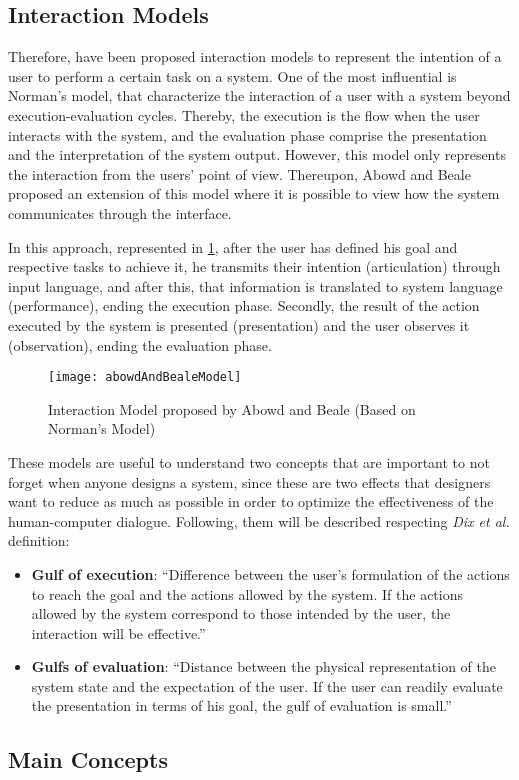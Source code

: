 \subsection{Interaction Models}
\label{subsec:interaction_models}

Therefore, have been proposed interaction models to represent the intention of a user to perform a certain task on a system. One of the most influential is Norman’s model, that characterize the interaction of a user with a system beyond execution-evaluation cycles. \cite{humanComputerInteraction} Thereby, the execution is the flow when the user interacts with the system, and the evaluation phase comprise the presentation and the interpretation of the system output. However, this model only represents the interaction from the users’ point of view. Thereupon, Abowd and Beale \cite{userSystemsAndInterfaces_aUnifyingFrameworkForInteraction} proposed an extension of this model where it is possible to view how the system communicates through the interface.

In this approach, represented in \ref{fig:abowdAndBealeModel}, after the user has defined his goal and respective tasks to achieve it, he transmits their intention (articulation) through input language, and after this, that information is translated to system language (performance), ending the execution phase. Secondly, the result of the action executed by the system is presented (presentation) and the user observes it (observation), ending the evaluation phase.

\begin{figure}[htbp]
	\centering
	\texttt{[image: abowdAndBealeModel]}
	\caption{Interaction Model proposed by Abowd and Beale \cite{userInterfacesForAll_newPerspectivesIntoHumanComputerInteraction} (Based on Norman’s Model)}
	\label{fig:abowdAndBealeModel}
\end{figure}

These models are useful to understand two concepts that are important to not forget when anyone designs a system, since these are two effects that designers want to reduce as much as possible in order to optimize the effectiveness of the human-computer dialogue. Following, them will be described respecting \textit{Dix et al.} \cite{humanComputerInteraction} definition:

\begin{itemize}
    \item \textbf{Gulf of execution}: “Difference between the user’s formulation of the actions to reach the goal and the actions allowed by the system. If the actions allowed by the system correspond to those intended by the user, the interaction will be effective.”
    \item \textbf{Gulfs of evaluation}: “Distance between the physical representation of the system state and the expectation of the user. If the user can readily evaluate the presentation in terms of his goal, the gulf of evaluation is small.”
\end{itemize}

\subsection{Main Concepts}
\label{subsec:main_concepts}
